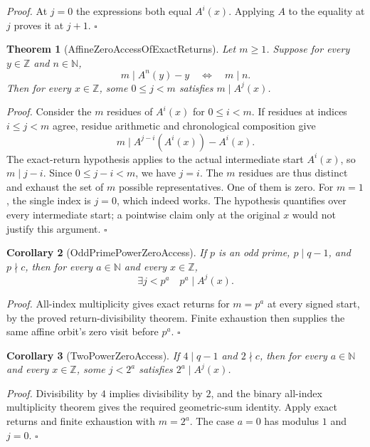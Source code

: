 \documentclass[11pt,letterpaper]{article}
\newcommand{\N}{\mathbb{N}}
\newcommand{\Z}{\mathbb{Z}}
\newtheorem{theorem}{Theorem}
\newtheorem{corollary}[theorem]{Corollary}
\newenvironment{proof}{\noindent\textit{Proof.}}{\hfill\(\square\)}
\begin{document}
\begin{proof}
At \(j=0\) the expressions both equal \(A^i(x)\).
Applying \(A\) to the equality at \(j\) proves it at \(j+1\).
\end{proof}

\begin{theorem}[AffineZeroAccessOfExactReturns]
Let \(m\ge1\). Suppose for every \(y\in\Z\) and \(n\in\N\),
\[
 m\mid A^n(y)-y\quad\Longleftrightarrow\quad m\mid n.
\]
Then for every \(x\in\Z\), some \(0\le j<m\) satisfies
\(m\mid A^j(x)\).
\end{theorem}

\begin{proof}
Consider the \(m\) residues of \(A^i(x)\) for \(0\le i<m\).
If residues at indices \(i\le j<m\) agree, residue arithmetic
and chronological composition give
\[
 m\mid A^{j-i}(A^i(x))-A^i(x).
\]
The exact-return hypothesis applies to the actual intermediate
start \(A^i(x)\), so \(m\mid j-i\). Since \(0\le j-i<m\),
we have \(j=i\). The \(m\) residues are thus distinct and
exhaust the set of \(m\) possible representatives. One of them
is zero. For \(m=1\), the single index is \(j=0\), which
indeed works. The hypothesis quantifies over every intermediate
start; a pointwise claim only at the original \(x\) would not
justify this argument.
\end{proof}

\begin{corollary}[OddPrimePowerZeroAccess]
If \(p\) is an odd prime, \(p\mid q-1\), and \(p\nmid c\),
then for every \(a\in\N\) and every \(x\in\Z\),
\[
 \exists j<p^a\quad p^a\mid A^j(x).
\]
\end{corollary}

\begin{proof}
All-index multiplicity gives exact returns for \(m=p^a\) at every
signed start, by the proved return-divisibility theorem.
Finite exhaustion then supplies the same affine orbit's zero
visit before \(p^a\).
\end{proof}

\begin{corollary}[TwoPowerZeroAccess]
If \(4\mid q-1\) and \(2\nmid c\), then for every \(a\in\N\)
and every \(x\in\Z\), some \(j<2^a\) satisfies \(2^a\mid A^j(x)\).
\end{corollary}

\begin{proof}
Divisibility by \(4\) implies divisibility by \(2\), and the
binary all-index multiplicity theorem gives the required
geometric-sum identity. Apply exact returns and finite exhaustion
with \(m=2^a\). The case \(a=0\) has modulus \(1\) and \(j=0\).
\end{proof}
\end{document}
